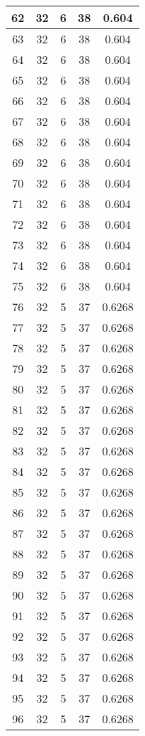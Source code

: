 \documentclass[letterpaper, 12pt]{article}
\begin{document}
\begin{longtable}{|c|c|c|c|c|}
\hline
62 & 32 & 6 & 38 & 0.604 \\
\hline
63 & 32 & 6 & 38 & 0.604 \\
\hline
64 & 32 & 6 & 38 & 0.604 \\
\hline
65 & 32 & 6 & 38 & 0.604 \\
\hline
66 & 32 & 6 & 38 & 0.604 \\
\hline
67 & 32 & 6 & 38 & 0.604 \\
\hline
68 & 32 & 6 & 38 & 0.604 \\
\hline
69 & 32 & 6 & 38 & 0.604 \\
\hline
70 & 32 & 6 & 38 & 0.604 \\
\hline
71 & 32 & 6 & 38 & 0.604 \\
\hline
72 & 32 & 6 & 38 & 0.604 \\
\hline
73 & 32 & 6 & 38 & 0.604 \\
\hline
74 & 32 & 6 & 38 & 0.604 \\
\hline
75 & 32 & 6 & 38 & 0.604 \\
\hline
76 & 32 & 5 & 37 & 0.6268 \\
\hline
77 & 32 & 5 & 37 & 0.6268 \\
\hline
78 & 32 & 5 & 37 & 0.6268 \\
\hline
79 & 32 & 5 & 37 & 0.6268 \\
\hline
80 & 32 & 5 & 37 & 0.6268 \\
\hline
81 & 32 & 5 & 37 & 0.6268 \\
\hline
82 & 32 & 5 & 37 & 0.6268 \\
\hline
83 & 32 & 5 & 37 & 0.6268 \\
\hline
84 & 32 & 5 & 37 & 0.6268 \\
\hline
85 & 32 & 5 & 37 & 0.6268 \\
\hline
86 & 32 & 5 & 37 & 0.6268 \\
\hline
87 & 32 & 5 & 37 & 0.6268 \\
\hline
88 & 32 & 5 & 37 & 0.6268 \\
\hline
89 & 32 & 5 & 37 & 0.6268 \\
\hline
90 & 32 & 5 & 37 & 0.6268 \\
\hline
91 & 32 & 5 & 37 & 0.6268 \\
\hline
92 & 32 & 5 & 37 & 0.6268 \\
\hline
93 & 32 & 5 & 37 & 0.6268 \\
\hline
94 & 32 & 5 & 37 & 0.6268 \\
\hline
95 & 32 & 5 & 37 & 0.6268 \\
\hline
96 & 32 & 5 & 37 & 0.6268 \\

\end{longtable}
\end{document}
